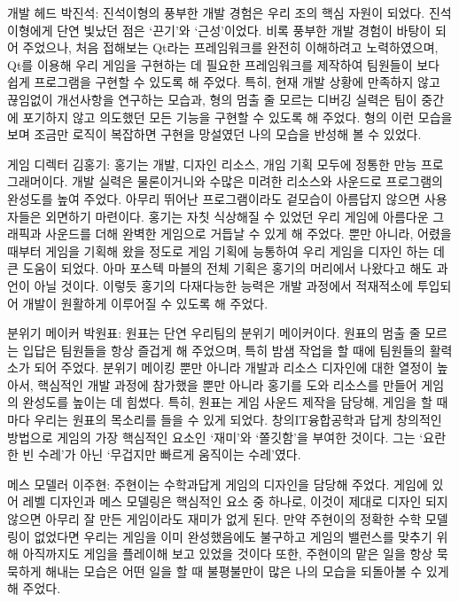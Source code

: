 \documentclass[10pt,oneside,a4paper,titlepage]{article}
\begin{document}
개발 헤드 박진석:
 진석이형의 풍부한 개발 경험은 우리 조의 핵심 자원이 되었다. 진석이형에게 단연 빛났던 점은 ‘끈기’와 ‘근성’이었다. 비록 풍부한 개발 경험이 바탕이 되어 주었으나, 처음 접해보는 Qt라는 프레임워크를 완전히 이해하려고 노력하였으며, Qt를 이용해 우리 게임을 구현하는 데 필요한 프레임워크를 제작하여 팀원들이 보다 쉽게 프로그램을 구현할 수 있도록 해 주었다. 특히, 현재 개발 상황에 만족하지 않고 끊임없이 개선사항을 연구하는 모습과, 형의 멈출 줄 모르는 디버깅 실력은 팀이 중간에 포기하지 않고 의도했던 모든 기능을 구현할 수 있도록 해 주었다. 형의 이런 모습을 보며 조금만 로직이 복잡하면 구현을 망설였던 나의 모습을 반성해 볼 수 있었다.

게임 디렉터 김홍기:
 홍기는 개발, 디자인 리소스, 개임 기획 모두에 정통한 만능 프로그래머이다. 개발 실력은 물론이거니와 수많은 미려한 리소스와 사운드로 프로그램의 완성도를 높여 주었다. 아무리 뛰어난 프로그램이라도 겉모습이 아름답지 않으면 사용자들은 외면하기 마련이다. 홍기는 자칫 식상해질 수 있었던 우리 게임에 아름다운 그래픽과 사운드를 더해 완벽한 게임으로 거듭날 수 있게 해 주었다. 뿐만 아니라, 어렸을 때부터 게임을 기획해 왔을 정도로 게임 기획에 능통하여 우리 게임을 디자인 하는 데 큰 도움이 되었다. 아마 포스텍 마블의 전체 기획은 홍기의 머리에서 나왔다고 해도 과언이 아닐 것이다. 이렇듯 홍기의 다재다능한 능력은 개발 과정에서 적재적소에 투입되어 개발이 원활하게 이루어질 수 있도록 해 주었다.

분위기 메이커 박원표:
 원표는 단연 우리팀의 분위기 메이커이다. 원표의 멈출 줄 모르는 입답은 팀원들을 항상 즐겁게 해 주었으며, 특히 밤샘 작업을 할 때에 팀원들의 활력소가 되어 주었다. 분위기 메이킹 뿐만 아니라 개발과 리소스 디자인에 대한 열정이 높아서, 핵심적인 개발 과정에 참가했을 뿐만 아니라 홍기를 도와 리소스를 만들어 게임의 완성도를 높이는 데 힘썼다. 특히, 원표는 게임 사운드 제작을 담당해, 게임을 할 때마다 우리는 원표의 목소리를 들을 수 있게 되었다. 창의IT융합공학과 답게 창의적인 방법으로 게임의 가장 핵심적인 요소인 ‘재미’와 ‘쫄깃함’을 부여한 것이다. 그는 ‘요란한 빈 수레’가 아닌 ‘무겁지만 빠르게 움직이는 수레’였다.

메스 모델러 이주현:
 주현이는 수학과답게 게임의 디자인을 담당해 주었다. 게임에 있어 레벨 디자인과 메스 모델링은 핵심적인 요소 중 하나로, 이것이 제대로 디자인 되지 않으면 아무리 잘 만든 게임이라도 재미가 없게 된다. 만약 주현이의 정확한 수학 모델링이 없었다면 우리는 게임을 이미 완성했음에도 불구하고 게임의 밸런스를 맞추기 위해 아직까지도 게임을 플레이해 보고 있었을 것이다 또한, 주현이의 맡은 일을 항상 묵묵하게 해내는 모습은 어떤 일을 할 때 불평불만이 많은 나의 모습을 되돌아볼 수 있게 해 주었다.
\end{document}
